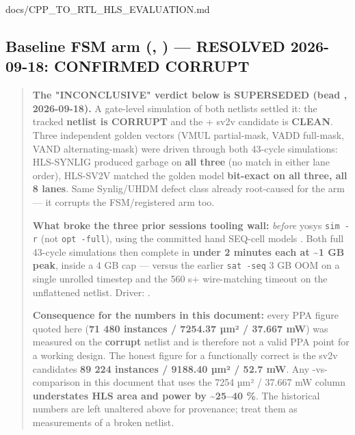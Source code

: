 \begin{relocated}{docs/CPP_TO_RTL_HLS_EVALUATION.md}
\subsection{\texorpdfstring{Baseline FSM arm (,
) --- \warn{} RESOLVED 2026-09-18:
\textbf{CONFIRMED
CORRUPT}}{Baseline FSM arm (, ) ---  RESOLVED 2026-09-18: CONFIRMED CORRUPT}}\label{tm:dec:cpp-to-rtl-hls-evaluation:baseline-fsm-arm-valu-hls-use-synligtrue-warning-resolved-2026-09-18-confirmed-corrupt}

\begin{quote}
\warn{} \textbf{The "INCONCLUSIVE" verdict below is SUPERSEDED (bead
, 2026-09-18).} A gate-level simulation of both netlists
settled it: the tracked \textbf{ netlist is
CORRUPT} and the  + sv2v candidate is
\textbf{CLEAN}. Three independent golden vectors (VMUL partial-mask,
VADD full-mask, VAND alternating-mask) were driven through both 43-cycle
simulations: HLS-SYNLIG produced garbage on \textbf{all three} (no match
in either lane order), HLS-SV2V matched the golden model
\textbf{bit-exact on all three, all 8 lanes}. Same
Synlig/\allowbreak{}UHDM defect class already root-caused for the
 arm --- it corrupts the FSM/\allowbreak{}registered arm too.

\textbf{What broke the three prior sessions\textquotesingle{} tooling
wall:}  \emph{before} yosys \texttt{sim\ -\allowbreak{}r}
(not \texttt{opt\ -\allowbreak{}full}), using the committed hand
SEQ-cell models . Both full
43-cycle simulations then complete in \textbf{under 2 minutes each at
\textasciitilde1 GB peak}, inside a 4 GB cap --- versus the earlier
\texttt{sat\ -\allowbreak{}seq} 3 GB OOM on a single unrolled timestep
and the 560 s+ wire-matching timeout on the unflattened netlist. Driver:
.

\textbf{Consequence for the numbers in this document:} every
 PPA figure quoted here (\textbf{71 480 instances /
7254.37 µm² / 37.667 mW}) was measured on the \textbf{corrupt} netlist
and is therefore not a valid PPA point for a working design. The honest
figure for a functionally correct  is the sv2v
candidate\textquotesingle s \textbf{89 224 instances / 9188.40 µm² /
52.7 mW}. Any -vs- comparison in this document that
uses the 7254 µm² / 37.667 mW column \textbf{understates HLS area and
power by \textasciitilde25--40 \%}. The historical numbers are left
unaltered above for provenance; treat them as measurements of a broken
netlist.


\end{quote}
\end{relocated}
